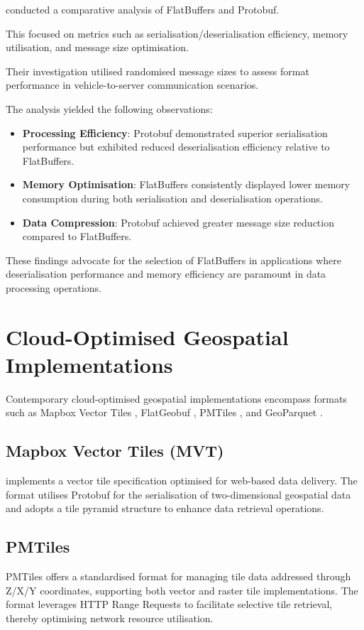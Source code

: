 \citet{daniel_persson_2020} conducted a comparative analysis of FlatBuffers and Protobuf.

This focused on metrics such as serialisation/deserialisation efficiency, memory utilisation, and message size optimisation.

Their investigation utilised randomised message sizes to assess format performance in vehicle-to-server communication scenarios.

The analysis yielded the following observations:

\begin{itemize}
  \item \textbf{Processing Efficiency}: Protobuf demonstrated superior serialisation performance but exhibited reduced deserialisation efficiency relative to FlatBuffers.
  \item \textbf{Memory Optimisation}: FlatBuffers consistently displayed lower memory consumption during both serialisation and deserialisation operations.
  \item \textbf{Data Compression}: Protobuf achieved greater message size reduction compared to FlatBuffers.
\end{itemize}

These findings advocate for the selection of FlatBuffers in applications where deserialisation performance and memory efficiency are paramount in data processing operations.

\section{Cloud-Optimised Geospatial Implementations}
\label{rw:cloud_optimised_implementations}
Contemporary cloud-optimised geospatial implementations encompass formats such as Mapbox Vector Tiles \citep{mapbox-vector-tiles}, FlatGeobuf \citep{flatgeobuf}, PMTiles \citep{pmtiles}, and GeoParquet \citep{geoparquet}.

\subsection{Mapbox Vector Tiles (MVT)}
\label{rw:cloud_optimised_implementations:mvt}
\citet{mapbox-vector-tiles} implements a vector tile specification optimised for web-based data delivery. The format utilises Protobuf for the serialisation of two-dimensional geospatial data and adopts a tile pyramid structure to enhance data retrieval operations.

\subsection{PMTiles}
\label{rw:cloud_optimised_implementations:pmtiles}
PMTiles offers a standardised format for managing tile data addressed through Z/X/Y coordinates, supporting both vector and raster tile implementations. The format leverages HTTP Range Requests \citep{http_range_requests} to facilitate selective tile retrieval, thereby optimising network resource utilisation.

